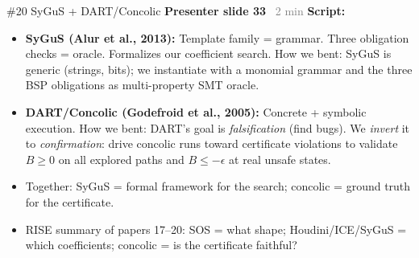 \documentclass[aspectratio=169]{beamer}
\newcommand{\syncline}[2]{\textbf{#1} \hfill \textcolor{gray}{#2}}
\begin{document}
\begin{frame}{\#20 SyGuS + DART/Concolic}
\syncline{Presenter slide 33}{~2 min}
\textbf{Script:}
\begin{itemize}
  \item \textbf{SyGuS (Alur et al., 2013):} Template family = grammar. Three obligation checks = oracle. Formalizes our coefficient search. How we bent: SyGuS is generic (strings, bits); we instantiate with a monomial grammar and the three BSP obligations as multi-property SMT oracle.
  \item \textbf{DART/Concolic (Godefroid et al., 2005):} Concrete + symbolic execution. How we bent: DART's goal is \emph{falsification} (find bugs). We \emph{invert} it to \emph{confirmation}: drive concolic runs toward certificate violations to validate $B \ge 0$ on all explored paths and $B \le -\epsilon$ at real unsafe states.
  \item Together: SyGuS = formal framework for the search; concolic = ground truth for the certificate.
  \item RISE summary of papers 17--20: SOS = what shape; Houdini/ICE/SyGuS = which coefficients; concolic = is the certificate faithful?
\end{itemize}
\end{frame}

\end{document}
